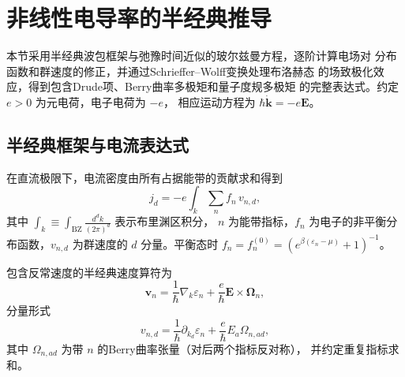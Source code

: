 \chapter{非线性电导率的半经典推导}
\label{nonlinear-hall}

本节采用半经典波包框架与弛豫时间近似的玻尔兹曼方程\cite{xiao_berry_2010}，逐阶计算电场对
分布函数和群速度的修正，并通过Schrieffer–Wolff变换处理布洛赫态
的场致极化效应，得到包含Drude项、Berry曲率多极矩和量子度规多极矩
的完整表达式。\cite{Fang2024}约定 \(e>0\) 为元电荷，电子电荷为 \(-e\)，
相应运动方程为 \(\hbar\dot{\mathbf{k}} = -e\mathbf{E}\)。

\section{半经典框架与电流表达式}

在直流极限下，电流密度由所有占据能带的贡献求和得到
\begin{equation}
  j_d = -e \int_k \sum_n f_n\, v_{n,d},
  \label{eq:jdef}
\end{equation}
其中 \(\int_k \equiv \int_{\mathrm{BZ}} \frac{d^d k}{(2\pi)^d}\) 表示布里渊区积分，
\(n\) 为能带指标，\(f_n\) 为电子的非平衡分布函数，\(v_{n,d}\) 为群速度的
\(d\) 分量。平衡态时 \(f_n = f_n^{(0)} = (e^{\beta(\varepsilon_n-\mu)}+1)^{-1}\)。

包含反常速度的半经典速度算符为
\begin{equation}
  \mathbf{v}_n = \frac{1}{\hbar}\nabla_k \varepsilon_n
  + \frac{e}{\hbar} \mathbf{E} \times \bm{\Omega}_n,
  \label{eq:semi_v}
\end{equation}
分量形式
\begin{equation}
  v_{n,d} = \frac{1}{\hbar}\partial_{k_d}\varepsilon_n
  + \frac{e}{\hbar} E_a \Omega_{n,ad},
  \label{eq:vd}
\end{equation}
其中 \(\Omega_{n,ad}\) 为带 \(n\) 的Berry曲率张量（对后两个指标反对称），
并约定重复指标求和。

